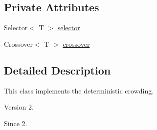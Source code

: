 \subsection*{Private Attributes}
\begin{DoxyCompactItemize}
\item 
Selector$<$ T $>$ \hyperlink{classjenes_1_1stage_1_1operator_1_1common_1_1_deterministic_crowder_3_01_t_01extends_01_chromosome_01_4_a741955421216546663d52fd901c75649}{selector}
\item 
Crossover$<$ T $>$ \hyperlink{classjenes_1_1stage_1_1operator_1_1common_1_1_deterministic_crowder_3_01_t_01extends_01_chromosome_01_4_a992be483e017714e73cfb444385b637c}{crossover}
\end{DoxyCompactItemize}


\subsection{Detailed Description}
This class implements the deterministic crowding.

\begin{DoxyVersion}{Version}
2. 
\end{DoxyVersion}
\begin{DoxySince}{Since}
2. 
\end{DoxySince}


